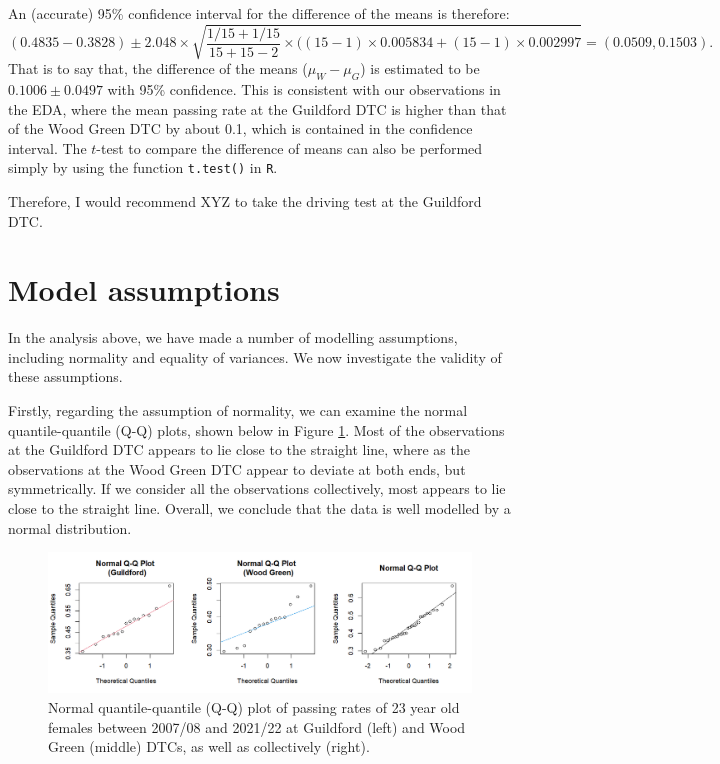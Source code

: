 \documentclass{article}
\begin{document}
An (accurate) 95\% confidence interval for the difference of the means is therefore:
$$
(0.4835-0.3828)\pm 2.048 \times \sqrt{\frac{1/15+1/15}{15+15-2}\times((15-1)\times0.005834+(15-1)\times0.002997} = (0.0509, 0.1503).
$$
That is to say that, the difference of the means ($\mu_W-\mu_G$) is estimated to be $0.1006 \pm 0.0497$ with 95\% confidence. This is consistent with our observations in the EDA, where the mean passing rate at the Guildford DTC is higher than that of the Wood Green DTC by about 0.1, which is contained in the confidence interval. The $t$-test to compare the difference of means can also be performed simply by using the function \texttt{t.test()} in \texttt{R}. 

Therefore, I would recommend XYZ to take the driving test at the Guildford DTC.

\section*{Model assumptions}
In the analysis above, we have made a number of modelling assumptions, including normality and equality of variances. We now investigate the validity of these assumptions.

Firstly, regarding the assumption of normality, we can examine the normal quantile-quantile (Q-Q) plots, shown below in Figure \ref{qq}. Most of the observations at the Guildford DTC appears to lie close to the straight line, where as the observations at the Wood Green DTC appear to deviate at both ends, but symmetrically. If we consider all the observations collectively, most appears to lie close to the straight line. Overall, we conclude that the data is well modelled by a normal distribution.

\begin{figure}[ht!]
\centering
\includegraphics[width=\linewidth]{figures/qq.png}
\caption{Normal quantile-quantile (Q-Q) plot of passing rates of 23 year old females between 2007/08 and 2021/22 at Guildford (left) and Wood Green (middle) DTCs, as well as collectively (right).} 
\label{qq}
\end{figure}
\end{document}
